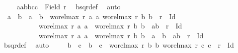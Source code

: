 \begin{isabellebody}
\ \ \isamarkupfalse%
\ {}{\isacharcolon}{\kern0pt}\ {\isachardoublequoteopen}{\isacharbraceleft}{\kern0pt}a{}{\isacharcomma}{\kern0pt}a{}{\isacharcomma}{\kern0pt}b{}{\isacharcomma}{\kern0pt}b{}{\isacharcomma}{\kern0pt}c{}{\isacharcomma}{\kern0pt}c{}{\isacharbraceright}{\kern0pt}\ {\isasymle}\ Field\ r{\isachardoublequoteclose}\ \isamarkupfalse%
\ bsqr{\isacharunderscore}{\kern0pt}def\ \isamarkupfalse%
\ auto\isanewline
\ \ \isamarkupfalse%
\ {}{\isacharcolon}{\kern0pt}\ {\isachardoublequoteopen}a{}\ {\isacharequal}{\kern0pt}\ b{}\ {\isasymand}\ a{}\ {\isacharequal}{\kern0pt}\ b{}\ {\isasymor}\ {\isacharparenleft}{\kern0pt}wo{\isacharunderscore}{\kern0pt}rel{\isachardot}{\kern0pt}max{}\ r\ a{}\ a{}{\isacharcomma}{\kern0pt}\ wo{\isacharunderscore}{\kern0pt}rel{\isachardot}{\kern0pt}max{}\ r\ b{}\ b{}{\isacharparenright}{\kern0pt}\ {\isasymin}\ r\ {\isacharminus}{\kern0pt}\ Id\ {\isasymor}\isanewline
\ \ \ \ \ \ \ \ \ \ \ wo{\isacharunderscore}{\kern0pt}rel{\isachardot}{\kern0pt}max{}\ r\ a{}\ a{}\ {\isacharequal}{\kern0pt}\ wo{\isacharunderscore}{\kern0pt}rel{\isachardot}{\kern0pt}max{}\ r\ b{}\ b{}\ {\isasymand}\ {\isacharparenleft}{\kern0pt}a{}{\isacharcomma}{\kern0pt}b{}{\isacharparenright}{\kern0pt}\ {\isasymin}\ r\ {\isacharminus}{\kern0pt}\ Id\ {\isasymor}\isanewline
\ \ \ \ \ \ \ \ \ \ \ wo{\isacharunderscore}{\kern0pt}rel{\isachardot}{\kern0pt}max{}\ r\ a{}\ a{}\ {\isacharequal}{\kern0pt}\ wo{\isacharunderscore}{\kern0pt}rel{\isachardot}{\kern0pt}max{}\ r\ b{}\ b{}\ {\isasymand}\ a{}\ {\isacharequal}{\kern0pt}\ b{}\ {\isasymand}\ {\isacharparenleft}{\kern0pt}a{}{\isacharcomma}{\kern0pt}b{}{\isacharparenright}{\kern0pt}\ {\isasymin}\ r\ {\isacharminus}{\kern0pt}\ Id{\isachardoublequoteclose}\isanewline
\ \ \isamarkupfalse%
\ {\isacharasterisk}{\kern0pt}\ \isamarkupfalse%
\ bsqr{\isacharunderscore}{\kern0pt}def\ \isamarkupfalse%
\ auto\isanewline
\ \ \isamarkupfalse%
\ {}{\isacharcolon}{\kern0pt}\ {\isachardoublequoteopen}b{}\ {\isacharequal}{\kern0pt}\ c{}\ {\isasymand}\ b{}\ {\isacharequal}{\kern0pt}\ c{}\ {\isasymor}\ {\isacharparenleft}{\kern0pt}wo{\isacharunderscore}{\kern0pt}rel{\isachardot}{\kern0pt}max{}\ r\ b{}\ b{}{\isacharcomma}{\kern0pt}\ wo{\isacharunderscore}{\kern0pt}rel{\isachardot}{\kern0pt}max{}\ r\ c{}\ c{}{\isacharparenright}{\kern0pt}\ {\isasymin}\ r\ {\isacharminus}{\kern0pt}\ Id\ {\isasymor}\isanewline

\end{isabellebody}
